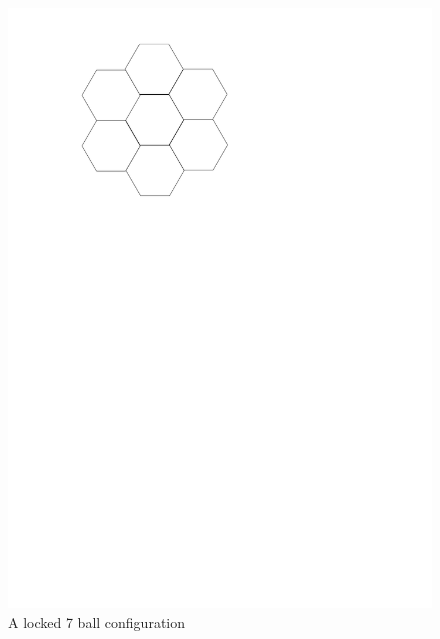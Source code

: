 \begin{figure}[ht]
\begin{center}
\includegraphics{graphics/7hexLocked.pdf}
\caption{A locked 7 ball configuration}
\label{figure:7hexLocked}
\end{center} 
\end{figure}
\newpage